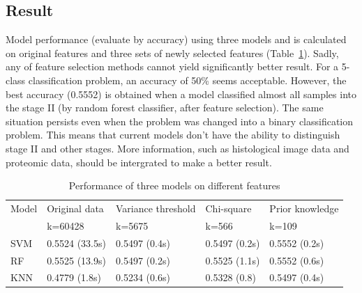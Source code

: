 \documentclass{article}
\begin{document}
\subsection{Result}
Model performance (evaluate by accuracy) using three models and is calculated on original features and three sets of newly selected features (Table~\ref{table:performance}). Sadly, any of feature selection methods cannot yield significantly better result. For a 5-class classification problem, an accuracy of 50\% seems acceptable. However, the best accuracy (0.5552) is obtained when a model classified almost all samples into the stage II (by random forest classifier, after feature selection). The same situation persists even when the problem was changed into a binary classification problem. This means that current models don't have the ability to distinguish stage II and other stages. More information, such as histological image data and proteomic data, should be intergrated to make a better result.
\begin{table}[htbp]
    \centering
    \caption{Performance of three models on different features}
    \begin{tabular}{lllll}
        \hline
        Model & Original data  & Variance threshold & Chi-square    & Prior knowledge \\
              & k=60428        & k=5675             & k=566         & k=109           \\ \hline
        SVM   & 0.5524 (33.5s) & 0.5497 (0.4s)      & 0.5497 (0.2s) & 0.5552 (0.2s)   \\
        RF    & 0.5525 (13.9s) & 0.5497 (0.2s)      & 0.5525 (1.1s) & 0.5552   (0.6s) \\
        KNN   & 0.4779 (1.8s)  & 0.5234 (0.6s)      & 0.5328 (0.8)  & 0.5497 (0.4s)   \\ \hline
    \end{tabular}
    \label{table:performance}
\end{table}




\end{document}
